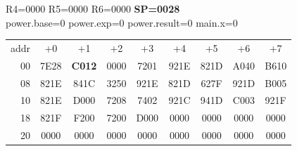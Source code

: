 \begin{tcolorbox}[stepbox, title={Step 1 \hfill PC 00 \quad LI SP, 40}]
R4=0000 R5=0000 R6=0000 \textcolor{wrt}{\textbf{SP=0028}}\\
\textcolor{dim}{power.base=0  power.exp=0  power.result=0  main.x=0}\\[1pt]
{\setlength{\tabcolsep}{1.6pt}\begin{tabular}{@{}r*{8}{c}@{}}
\textcolor{dim}{addr} & \textcolor{dim}{+0} & \textcolor{dim}{+1} & \textcolor{dim}{+2} & \textcolor{dim}{+3} & \textcolor{dim}{+4} & \textcolor{dim}{+5} & \textcolor{dim}{+6} & \textcolor{dim}{+7}\\
\textcolor{dim}{00} & 7E28 & \cellcolor{pcc}\textbf{C012} & 0000 & 7201 & 921E & 821D & A040 & B610\\
\textcolor{dim}{08} & 821E & 841C & 3250 & 921E & 821D & 627F & 921D & B005\\
\textcolor{dim}{10} & 821E & D000 & 7208 & 7402 & 921C & 941D & C003 & 921F\\
\textcolor{dim}{18} & 821F & F200 & 7200 & D000 & \cellcolor{datac}0000 & \cellcolor{datac}0000 & \cellcolor{datac}0000 & \cellcolor{datac}0000\\
\textcolor{dim}{20} & \cellcolor{stackc}0000 & \cellcolor{stackc}0000 & \cellcolor{stackc}0000 & \cellcolor{stackc}0000 & \cellcolor{stackc}0000 & \cellcolor{stackc}0000 & \cellcolor{stackc}0000 & \cellcolor{stackc}0000\\
\end{tabular}}
\end{tcolorbox}\par\vspace{3pt}
